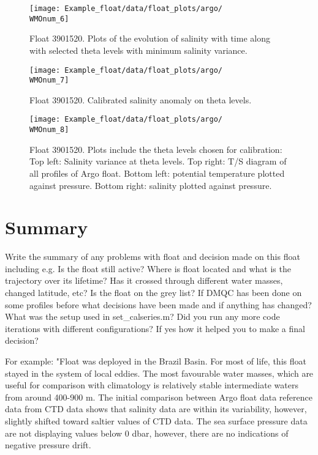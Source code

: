 \documentclass{article}
\newcommand{\WMOnum}{3901520} %
\begin{document}
\begin{flushleft}
\begin{figure}[H]
    \label{SalAnomOnTheta_Argo}
\end{figure}
\newpage
\begin{figure}[H]
    \centering    
    \texttt{[image: Example\_float/data/float\_plots/argo/\\WMOnum\_6]}
    \caption{Float \WMOnum. Plots of the evolution of salinity with time along with selected theta levels with minimum salinity variance.}
    \label{SalErrOnTheta_Argo}
\end{figure}
\begin{figure}[H]
    \centering    
    \texttt{[image: Example\_float/data/float\_plots/argo/\\WMOnum\_7]}
    \caption{Float \WMOnum. Calibrated salinity anomaly on theta levels.}
    \label{CalibSalAnomOnTheta_Argo}
\end{figure}
\begin{figure}[H]
    \centering    
    \texttt{[image: Example\_float/data/float\_plots/argo/\\WMOnum\_8]}
    \caption{Float \WMOnum. Plots include the theta levels chosen for calibration: Top left: Salinity variance at theta levels. Top right: T/S diagram of all profiles of Argo float. Bottom left: potential temperature plotted against pressure. Bottom right: salinity plotted against pressure.}
    \label{Salinity_OWlevels_Argo}
\end{figure}

\newpage
\section{Summary}
Write the summary of any problems with float and decision made on this float including e.g. Is the float still active? Where is float located and what is the trajectory over its lifetime? Has it crossed through different water masses, changed latitude, etc? Is the float on the grey list? If DMQC has been done on some profiles before what decisions have been made and if anything has changed? What was the setup used in set\_calseries.m? Did you run any more code iterations with different configurations? If yes how it helped you to make a final decision? 
\vspace{0.5cm}

For example: "Float was deployed in the Brazil Basin. For most of life, this float stayed in the system of local eddies. The most favourable water masses, which are useful for comparison with climatology is relatively stable intermediate waters from around 400-900 m. The initial comparison between Argo float data reference data from CTD data shows that salinity data are within its variability, however, slightly shifted toward saltier values of CTD data. The sea surface pressure data are not displaying values below 0 dbar, however, there are no indications of negative pressure drift.
 

\end{flushleft}
\end{document}
